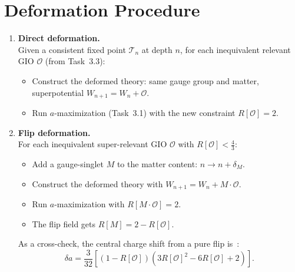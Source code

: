 \documentclass[12pt]{article}
\begin{document}
\section{Deformation Procedure}

\begin{enumerate}[label=\textbf{4.\arabic*}]

\item \textbf{Direct deformation.} \\
  Given a consistent fixed point $\mathcal{T}_n$ at depth $n$, for each inequivalent relevant GIO $\mathcal{O}$ (from Task~3.3):
  \begin{itemize}
    \item Construct the deformed theory: same gauge group and matter, superpotential $W_{n+1} = W_n + \mathcal{O}$.
    \item Run $a$-maximization (Task~3.1) with the new constraint $R[\mathcal{O}] = 2$.
  \end{itemize}

\item \textbf{Flip deformation.} \\
  For each inequivalent super-relevant GIO $\mathcal{O}$ with $R[\mathcal{O}] < \frac{4}{3}$:
  \begin{itemize}
    \item Add a gauge-singlet $M$ to the matter content: $n \to n + \delta_M$.
    \item Construct the deformed theory with $W_{n+1} = W_n + M \cdot \mathcal{O}$.
    \item Run $a$-maximization with $R[M \cdot \mathcal{O}] = 2$.
    \item The flip field gets $R[M] = 2 - R[\mathcal{O}]$.
  \end{itemize}
  As a cross-check, the central charge shift from a pure flip is~\cite{CMNS}:
  \begin{equation}
    \delta a = \frac{3}{32}\!\left[(1 - R[\mathcal{O}])(3R[\mathcal{O}]^2 - 6R[\mathcal{O}] + 2)\right].
  \end{equation}


\end{enumerate}
\end{document}
